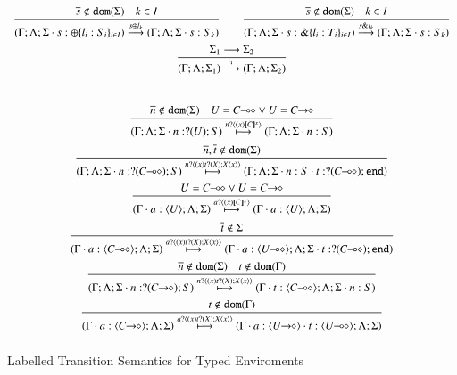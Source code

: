 \begin{figure}
\[\begin{array}{c}
		\tree{
			\dual{s} \notin \dom{\Sigma} \quad k \in I
		}{
			(\Gamma; \Lambda; \Sigma \cat s: \btsel{l_i: S_i}_{i \in I}) \by{\bactsel{s}{l_k}} (\Gamma; \Lambda; \Sigma \cat s:S_k)
		}
		\qquad
		\tree{
			\dual{s} \notin \dom{\Sigma} \quad k \in I
		}{
			(\Gamma; \Lambda; \Sigma \cat s: \btbra{l_i: T_i}_{i \in I}) \by{\bactbra{s}{l_k}} (\Gamma; \Lambda; \Sigma \cat s:S_k)
		}
		\\[6mm]

		\tree{
			\Sigma_1 \red \Sigma_2
		}{
			(\Gamma; \Lambda; \Sigma_1) \by{\tau} (\Gamma; \Lambda; \Sigma_2)
		}

		\vspace{10mm}\\


		\tree{
			\dual{n} \notin \dom{\Sigma} \quad U = \lhot{C} \vee U = \shot{C}
		}{
			(\Gamma; \Lambda; \Sigma \cat n: \btinp{U} S) \hby{\bactinp{n}{\abs{x}{\map{C}^x}}} (\Gamma; \Lambda; \Sigma \cat n: S)
		}
		\\[6mm]

		\tree{
			\dual{n}, \dual{t} \notin \dom{\Sigma}
		}{
			(\Gamma; \Lambda; \Sigma \cat n: \btinp{\lhot{C}} S) \hby{\bactinp{n}{\abs{x}{\binp{t}{X} \appl{X}{x}}}} (\Gamma; \Lambda; \Sigma \cat n: S \cat t: \btinp{\lhot{C}} \tinact)
		}
		\\[6mm]

		\tree{
			U = \lhot{C} \vee U = \shot{C}
		}{
		(\Gamma \cat a: \chtype{U}; \Lambda; \Sigma) \hby{\bactinp{a}{\abs{x}{\map{C}^x}}} (\Gamma \cat a: \chtype{U}; \Lambda; \Sigma)
		}
		\\[6mm]

		\tree{
			\dual{t} \notin \Sigma
		}{
		(\Gamma \cat a: \chtype{\lhot{C}}; \Lambda; \Sigma) \hby{\bactinp{a}{\abs{x}{\binp{t}{X} \appl{X}{x}}}} (\Gamma \cat a: \chtype{\lhot{U}}; \Lambda; \Sigma \cat t: \btinp{\lhot{C}}
 \tinact)
		}
		\\[6mm]

		\tree{
			\dual{n} \notin \dom{\Sigma} \quad t \notin \dom{\Gamma}
		}{
			(\Gamma; \Lambda; \Sigma \cat n: \btinp{\shot{C}} S) \hby{\bactinp{n}{\abs{x}{\binp{t}{X} \appl{X}{x}}}} (\Gamma \cat t: \chtype{\lhot{C}}; \Lambda; \Sigma \cat n: S)
		}
		\\[6mm]
		\tree{
			t \notin \dom{\Gamma}
		}{
			(\Gamma \cat a: \chtype{\shot{C}}; \Lambda; \Sigma) \hby{\bactinp{a}{\abs{x}{\binp{t}{X} \appl{X}{x}}}} (\Gamma \cat a: \chtype{\shot{U}} \cat t: \chtype{\lhot{U}}; \Lambda; \Sigma)
		}
		\\[6mm]
	\end{array}
	\]
	\caption{Labelled Transition Semantics for Typed Enviroments \label{fig:envLTS}}
\end{figure}
